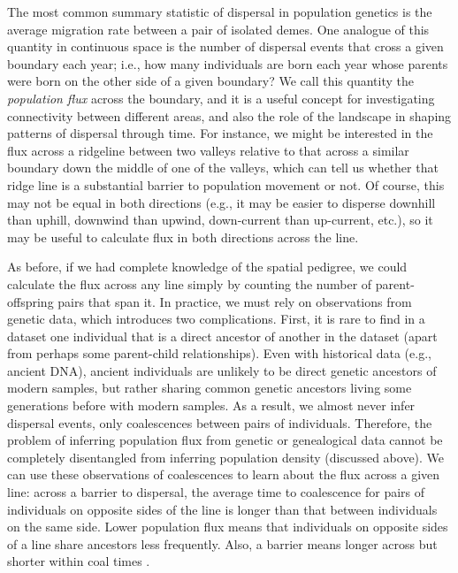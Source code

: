 \documentclass{ar-1col}
\begin{document}
The most common summary statistic of dispersal in population genetics 
is the average migration rate between a pair of isolated demes.
One analogue of this quantity in continuous space 
is the number of dispersal events that cross 
a given boundary each year;
i.e., how many individuals are born each year whose parents were born on the other side of a given boundary?
We call this quantity the \emph{population flux} across the boundary, 
and it is a useful concept for investigating connectivity 
between different areas, 
and also the role of the landscape in shaping patterns of dispersal through time.
For instance, 
we might be interested in the flux across a ridgeline between two valleys
relative to that across a similar boundary down the middle of one of the valleys,
which can tell us whether that ridge line is a substantial barrier to population movement or not.
Of course, this may not be equal in both directions 
(e.g., it may be easier to disperse downhill than uphill,
downwind than upwind,
down-current than up-current, etc.), 
so it may be useful to calculate flux in both directions across the line.

As before, if we had complete knowledge of the spatial pedigree,
we could calculate the flux across any line simply by counting the number of 
parent-offspring pairs that span it.
In practice, we must rely on observations from genetic data, 
which introduces two complications.
First, 
it is rare to find in a dataset one individual that is a direct ancestor of another in the dataset (apart from perhaps some parent-child relationships).
Even with historical data (e.g., ancient DNA),
ancient individuals are unlikely to be direct genetic ancestors of modern samples,
but rather sharing common genetic ancestors living some generations before with modern samples.
As a result, we almost never infer dispersal events, 
only coalescences between pairs of individuals.
Therefore, the problem of inferring population flux from genetic or genealogical data 
cannot be completely disentangled from inferring population density (discussed above).
We can use these observations of coalescences to learn about the flux across a given line:
across a barrier to dispersal,
the average time to coalescence for pairs of individuals on opposite sides of the line
is longer than that between individuals on the same side. 
Lower population flux means that individuals on opposite sides of a line share ancestors
less frequently.
Also, a barrier means longer across but shorter within coal times \citep{ringbauer2018estimating}.
\end{document}
